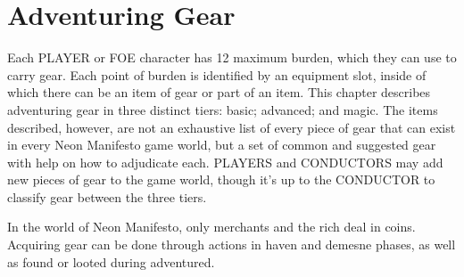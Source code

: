 \section{Adventuring Gear}
Each PLAYER or FOE character has 12 maximum burden, which they can use to carry gear. Each point of burden is identified by an equipment slot, inside of which there can be an item of gear or part of an item. This chapter describes adventuring gear in three distinct tiers: basic; advanced; and magic. The items described, however, are not an exhaustive list of every piece of gear that can exist in every Neon Manifesto game world, but a set of common and suggested gear with help on how to adjudicate each. PLAYERS and CONDUCTORS may add new pieces of gear to the game world, though it's up to the CONDUCTOR to classify gear between the three tiers.

In the world of Neon Manifesto, only merchants and the rich deal in coins. Acquiring gear can be done through actions in haven and demesne phases, as well as found or looted during adventured.

